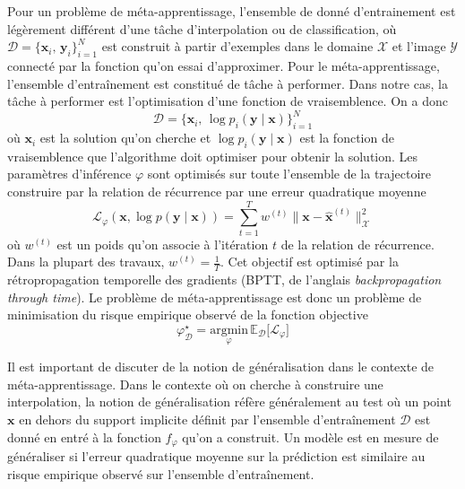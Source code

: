 Pour un problème de méta-apprentissage, l'ensemble de donné d'entrainement est légèrement différent d'une tâche d'interpolation ou de classification, 
où $\mathcal{D} = \{\mathbf{x}_i,\,\mathbf{y}_i\}_{i=1}^{N}$ est construit à partir d'exemples dans le domaine $\mathcal{X}$ et l'image $\mathcal{Y}$ 
connecté par la fonction qu'on essai d'approximer. Pour le méta-apprentissage, l'ensemble d'entraînement est constitué de tâche à performer. Dans 
notre cas, la tâche à performer est l'optimisation d'une fonction de vraisemblence. On a donc
\begin{equation}\label{eq:dmeta}
\mathcal{D} = \{\mathbf{x}_i,\, \log p_i(\mathbf{y} \mid \mathbf{x}) \}_{i=1}^{N}
\end{equation} 
où $\mathbf{x}_i$ est la solution qu'on cherche et $\log p_i(\mathbf{y} \mid \mathbf{x})$ est la fonction de vraisemblence que 
l'algorithme doit optimiser pour obtenir la solution. Les paramètres d'inférence $\varphi$ sont 
optimisés sur toute l'ensemble de la trajectoire construire par la relation de récurrence 
par une erreur quadratique moyenne
\begin{equation}\label{eq:loss intro}
        \mathcal{L}_{\varphi}(\mathbf{x}, \log p(\mathbf{y} \mid \mathbf{x})) = 
        \sum_{t=1}^{T} w^{(t)}\lVert \mathbf{x} - \hat{\mathbf{x}}^{(t)} \rVert_{\mathcal{X}}^{2}
\end{equation} 
où $w^{(t)}$ est un poids qu'on associe à l'itération $t$ de la relation de récurrence. Dans la plupart des travaux, 
$w^{(t)} = \frac{1}{T}$. Cet objectif est optimisé par la rétropropagation temporelle des gradients (BPTT, de l'anglais 
\textit{backpropagation through time}). 
Le problème de méta-apprentissage est donc un problème de minimisation du risque empirique observé de la 
fonction objective
\begin{equation}\label{eq:risk intro}
        \varphi_{\mathcal{D}}^{\star} = \underset{\varphi}{\mathrm{argmin}}\, \mathbb{E}_{\mathcal{D}}\big[ \mathcal{L}_{\varphi} \big]
\end{equation} 

Il est important de discuter de la notion de généralisation dans le contexte de méta-apprentissage. Dans le contexte 
où on cherche à construire une interpolation, la notion de généralisation réfère généralement au test où un point $\mathbf{x}$ 
en dehors du support implicite définit par l'ensemble d'entraînement $\mathcal{D}$ est donné en entré à la fonction $f_{\varphi}$ 
qu'on a construit. Un modèle est en mesure de généraliser si l'erreur quadratique moyenne sur la prédiction est similaire 
au risque empirique observé sur l'ensemble d'entraînement. 

